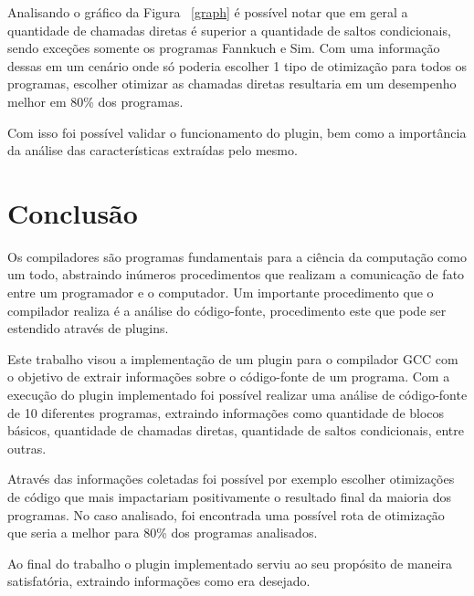 \documentclass[journal]{IEEEtran}
\begin{document}
Analisando o gráfico da Figura ~\ref{graph} é possível notar que em geral a quantidade de chamadas diretas é superior a quantidade de saltos condicionais, sendo exceções somente os programas Fannkuch e Sim. Com uma informação dessas em um cenário onde só poderia escolher 1 tipo de otimização para todos os programas, escolher otimizar as chamadas diretas resultaria em um desempenho melhor em 80\% dos programas.

Com isso foi possível validar o funcionamento do plugin, bem como a importância da análise das características extraídas pelo mesmo.

\section{Conclusão}

Os compiladores são programas fundamentais para a ciência da computação como um todo, abstraindo inúmeros procedimentos que realizam a comunicação de fato entre um programador e o computador. Um importante procedimento que o compilador realiza é a análise do código-fonte, procedimento este que pode ser estendido através de plugins.

Este trabalho visou a implementação de um plugin para o compilador GCC com o objetivo de extrair informações sobre o código-fonte de um programa. Com a execução do plugin implementado foi possível realizar uma análise de código-fonte de 10 diferentes programas, extraindo informações como quantidade de blocos básicos, quantidade de chamadas diretas, quantidade de saltos condicionais, entre outras.

Através das informações coletadas foi possível por exemplo escolher otimizações de código que mais impactariam positivamente o resultado final da maioria dos programas. No caso analisado, foi encontrada uma possível rota de otimização que seria a melhor para 80\% dos programas analisados.

Ao final do trabalho o plugin implementado serviu ao seu propósito de maneira satisfatória, extraindo informações como era desejado.
\end{document}
